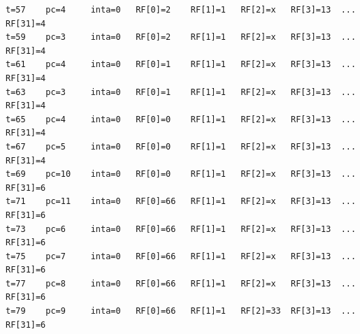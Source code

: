 {\begin{verbatim}
t=57    pc=4     inta=0   RF[0]=2    RF[1]=1   RF[2]=x   RF[3]=13  ...  RF[31]=4
t=59    pc=3     inta=0   RF[0]=2    RF[1]=1   RF[2]=x   RF[3]=13  ...  RF[31]=4
t=61    pc=4     inta=0   RF[0]=1    RF[1]=1   RF[2]=x   RF[3]=13  ...  RF[31]=4
t=63    pc=3     inta=0   RF[0]=1    RF[1]=1   RF[2]=x   RF[3]=13  ...  RF[31]=4
t=65    pc=4     inta=0   RF[0]=0    RF[1]=1   RF[2]=x   RF[3]=13  ...  RF[31]=4
t=67    pc=5     inta=0   RF[0]=0    RF[1]=1   RF[2]=x   RF[3]=13  ...  RF[31]=4
t=69    pc=10    inta=0   RF[0]=0    RF[1]=1   RF[2]=x   RF[3]=13  ...  RF[31]=6
t=71    pc=11    inta=0   RF[0]=66   RF[1]=1   RF[2]=x   RF[3]=13  ...  RF[31]=6
t=73    pc=6     inta=0   RF[0]=66   RF[1]=1   RF[2]=x   RF[3]=13  ...  RF[31]=6
t=75    pc=7     inta=0   RF[0]=66   RF[1]=1   RF[2]=x   RF[3]=13  ...  RF[31]=6
t=77    pc=8     inta=0   RF[0]=66   RF[1]=1   RF[2]=x   RF[3]=13  ...  RF[31]=6
t=79    pc=9     inta=0   RF[0]=66   RF[1]=1   RF[2]=33  RF[3]=13  ...  RF[31]=6
\end{verbatim}
}



